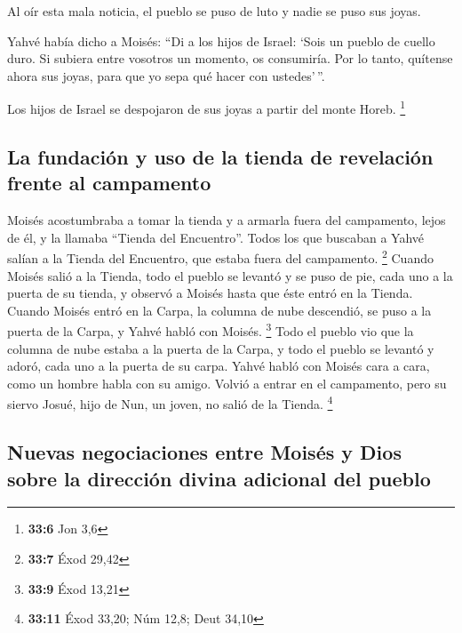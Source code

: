  Al oír esta mala noticia, el pueblo se puso de luto y
nadie se puso sus joyas.

 Yahvé había dicho a Moisés: ``Di a los hijos de Israel:
`Sois un pueblo de cuello duro. Si subiera entre vosotros un momento, os
consumiría. Por lo tanto, quítense ahora sus joyas, para que yo sepa qué
hacer con ustedes'\,''.

 Los hijos de Israel se despojaron de sus joyas a partir
del monte Horeb. \footnote{\textbf{33:6} Jon 3,6}

\hypertarget{la-fundaciuxf3n-y-uso-de-la-tienda-de-revelaciuxf3n-frente-al-campamento}{%
\subsection{La fundación y uso de la tienda de revelación frente al
campamento}\label{la-fundaciuxf3n-y-uso-de-la-tienda-de-revelaciuxf3n-frente-al-campamento}}

 Moisés acostumbraba a tomar la tienda y a armarla fuera
del campamento, lejos de él, y la llamaba ``Tienda del Encuentro''.
Todos los que buscaban a Yahvé salían a la Tienda del Encuentro, que
estaba fuera del campamento. \footnote{\textbf{33:7} Éxod 29,42}
 Cuando Moisés salió a la Tienda, todo el pueblo se
levantó y se puso de pie, cada uno a la puerta de su tienda, y observó a
Moisés hasta que éste entró en la Tienda.  Cuando Moisés
entró en la Carpa, la columna de nube descendió, se puso a la puerta de
la Carpa, y Yahvé habló con Moisés. \footnote{\textbf{33:9} Éxod 13,21}
 Todo el pueblo vio que la columna de nube estaba a la
puerta de la Carpa, y todo el pueblo se levantó y adoró, cada uno a la
puerta de su carpa.  Yahvé habló con Moisés cara a cara,
como un hombre habla con su amigo. Volvió a entrar en el campamento,
pero su siervo Josué, hijo de Nun, un joven, no salió de la Tienda.
\footnote{\textbf{33:11} Éxod 33,20; Núm 12,8; Deut 34,10}

\hypertarget{nuevas-negociaciones-entre-moisuxe9s-y-dios-sobre-la-direcciuxf3n-divina-adicional-del-pueblo}{%
\subsection{Nuevas negociaciones entre Moisés y Dios sobre la dirección
divina adicional del
pueblo}\label{nuevas-negociaciones-entre-moisuxe9s-y-dios-sobre-la-direcciuxf3n-divina-adicional-del-pueblo}}

